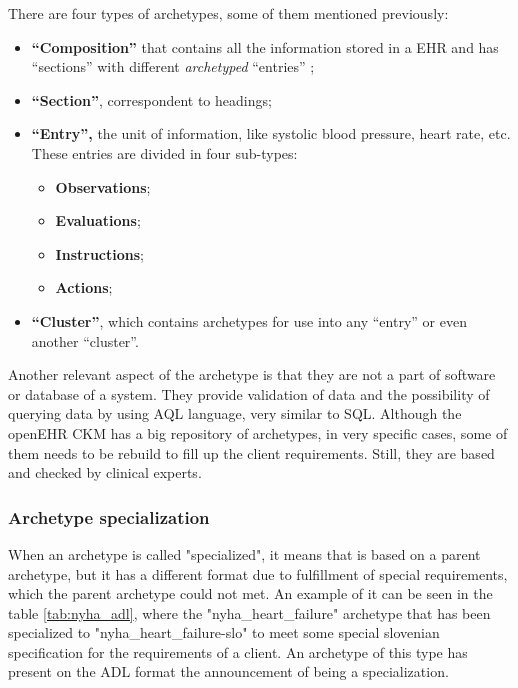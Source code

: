 \documentclass[mim_thesis.tex]{subfiles}
\begin{document}
There are four types of archetypes, some of them mentioned previously: 
\begin{itemize}[noitemsep]
\item \textbf{“Composition”} that contains all the information stored in a EHR and has “sections” with different \textit{archetyped} “entries” ; 
\item \textbf{“Section”}, correspondent to headings;
\item \textbf{“Entry”,} the unit of information, like systolic blood pressure, heart rate, etc. These entries are divided in four sub-types:
\begin{itemize}[noitemsep]
\item \textbf{Observations}; 
\item \textbf{Evaluations}; 
\item \textbf{Instructions}; 
\item \textbf{Actions};
\end{itemize}
\item \textbf{“Cluster”}, which contains archetypes for use into any “entry” or even another “cluster”.
\end{itemize}

Another relevant aspect of the archetype is that they are not a part of software or database of a system. They provide validation of data and the possibility of querying data by using AQL language, very similar to SQL. Although the openEHR CKM has a big repository of archetypes, in very specific cases, some of them needs to be rebuild to fill up the client requirements. Still, they are based and checked by clinical experts.

\subsubsection{Archetype specialization}  \label{sssec:AS}
When an archetype is called "specialized", it means that is based on a parent archetype, but it has a different format due to fulfillment of special requirements, which the parent archetype could not met. An example of it can be seen in the table \ref{tab:nyha_adl}, where the "nyha\_heart\_failure" archetype that has been specialized to "nyha\_heart\_failure-slo" to meet some special slovenian specification for the requirements of a client. An archetype of this type has present on the ADL format the announcement of being a specialization. 
\end{document}
